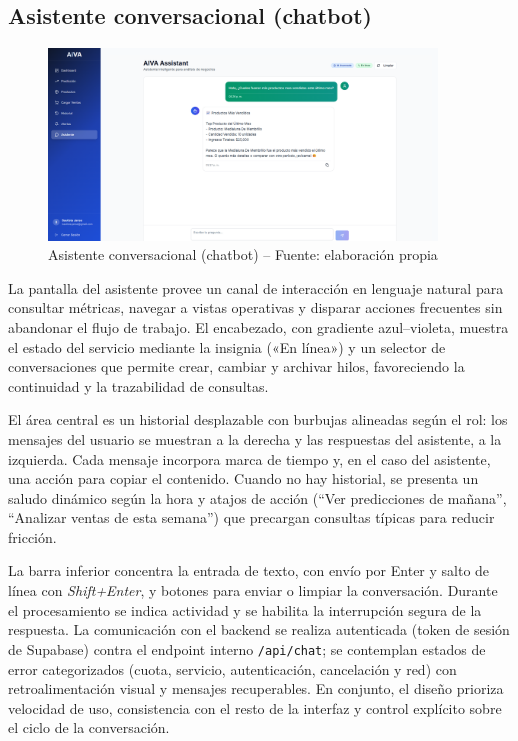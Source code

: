 \subsection{Asistente conversacional (chatbot)}
\begin{figure}[!htbp]
  \centering
  \includegraphics[width=0.92\textwidth]{images/chatbotPage.png}
  \caption{Asistente conversacional (chatbot) -- Fuente: elaboración propia}
  \label{fig:ui-chatbot}
\end{figure}
La pantalla del asistente provee un canal de interacción en lenguaje natural para consultar métricas, navegar a vistas operativas y disparar acciones frecuentes sin abandonar el flujo de trabajo. El encabezado, con gradiente azul–violeta, muestra el estado del servicio mediante la insignia («En línea») y un selector de conversaciones que permite crear, cambiar y archivar hilos, favoreciendo la continuidad y la trazabilidad de consultas.

El área central es un historial desplazable con burbujas alineadas según el rol: los mensajes del usuario se muestran a la derecha y las respuestas del asistente, a la izquierda. Cada mensaje incorpora marca de tiempo y, en el caso del asistente, una acción para copiar el contenido. Cuando no hay historial, se presenta un saludo dinámico según la hora y atajos de acción (“Ver predicciones de mañana”, “Analizar ventas de esta semana”) que precargan consultas típicas para reducir fricción.

La barra inferior concentra la entrada de texto, con envío por Enter y salto de línea con \textit{Shift+Enter}, y botones para enviar o limpiar la conversación. Durante el procesamiento se indica actividad y se habilita la interrupción segura de la respuesta. La comunicación con el backend se realiza autenticada (token de sesión de Supabase) contra el endpoint interno \texttt{/api/chat}; se contemplan estados de error categorizados (cuota, servicio, autenticación, cancelación y red) con retroalimentación visual y mensajes recuperables. En conjunto, el diseño prioriza velocidad de uso, consistencia con el resto de la interfaz y control explícito sobre el ciclo de la conversación.

